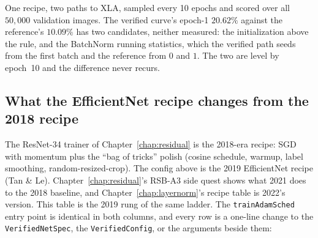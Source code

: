 \noindent One recipe, two paths to XLA, sampled every 10 epochs and scored
over all $50{,}000$ validation images. The verified curve's epoch-1
$20.62\%$ against the reference's $10.09\%$ has two candidates, neither
measured: the initialization above the rule, and the BatchNorm running
statistics, which the verified path seeds from the first batch and the
reference from $0$ and $1$. The two are level by epoch~10 and the
difference never recurs.

\subsection*{What the EfficientNet recipe changes from the 2018 recipe}

The ResNet-34 trainer of Chapter~\ref{chap:residual} is the
2018-era recipe: SGD with momentum plus the ``bag of tricks''
polish (cosine schedule, warmup, label smoothing,
random-resized-crop). The config above is the 2019
EfficientNet recipe (Tan \& Le).
Chapter~\ref{chap:residual}'s RSB-A3 side quest shows what 2021 does
to the 2018 baseline, and Chapter~\ref{chap:layernorm}'s recipe table is
2022's version. This table is the 2019 rung of the same ladder. The
\texttt{trainAdamSched} entry point is identical in both columns, and
every row is a one-line change to the \texttt{VerifiedNetSpec}, the
\texttt{VerifiedConfig}, or the arguments beside them:

